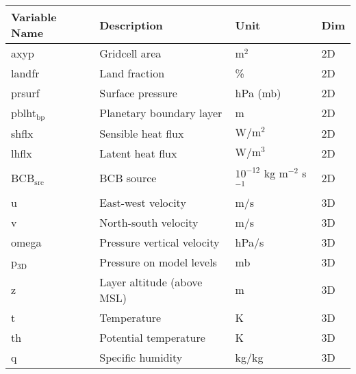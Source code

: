 \documentclass{article}
\begin{document}
    \begin{table}[htbp]
        \begin{tabular}{llll}
            \hline
            Variable Name       & Description                       & Unit                               & Dim \\ \hline
            axyp                & Gridcell area                     & $\text{m}^2$                       & 2D  \\
            landfr              & Land fraction                     & \%                                 & 2D  \\
            prsurf              & Surface pressure                  & hPa (mb)                           & 2D  \\
            pblht$_{\text{bp}}$ & Planetary boundary layer          & m                                  & 2D  \\
            shflx               & Sensible heat flux                & $\text{W}/\text{m}^2$              & 2D  \\
            lhflx               & Latent heat flux                  & $\text{W}/\text{m}^3$              & 2D  \\
            BCB$_{\text{src}}$  & BCB source                        & $10^{-12}$ kg m$^{-2}$ s$^{-1}$    & 2D  \\
            u                   & East-west velocity                & m/s                                & 3D  \\
            v                   & North-south velocity              & m/s                                & 3D  \\
            omega               & Pressure vertical velocity        & hPa/s                              & 3D  \\
            p$_{\text{3D}}$     & Pressure on model levels          & mb                                 & 3D  \\
            z                   & Layer altitude (above MSL)        & m                                  & 3D  \\
            t                   & Temperature                       & K                                  & 3D  \\
            th                  & Potential temperature             & K                                  & 3D  \\
            q                   & Specific humidity                 & kg/kg                              & 3D  \\

\end{tabular}
\end{table}
\end{document}
